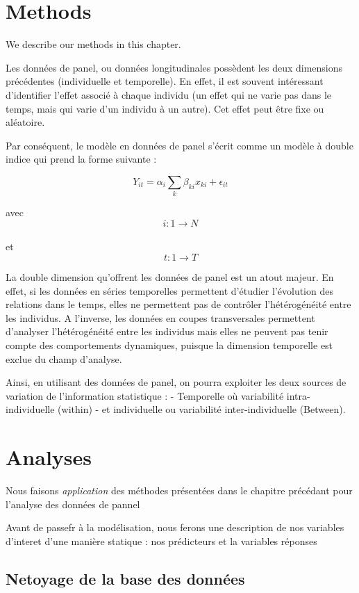 \documentclass[
]{book}
\begin{document}
\hypertarget{methods}{%
\chapter{Methods}\label{methods}}

We describe our methods in this chapter.

Les données de panel, ou données longitudinales possèdent les deux dimensions précédentes (individuelle et temporelle). En effet, il est souvent intéressant d'identifier l'effet associé à chaque individu (un effet qui ne varie pas dans le temps, mais qui varie d'un individu à un autre). Cet effet peut être fixe ou aléatoire.

Par conséquent, le modèle en données de panel s'écrit comme un modèle à double indice qui prend la forme suivante :

\[ Y_{it}= \alpha_i\sum_{k}\beta_{ki}x_{ki}+ \epsilon_{it} \]

avec
\[ i:1 \rightarrow N \]\\
et
\[ t:1 \rightarrow T \]

La double dimension qu'offrent les données de panel est un atout majeur. En effet, si les données en séries temporelles permettent d'étudier l'évolution des relations dans le temps, elles ne permettent pas de contrôler l'hétérogénéité entre les individus. A l'inverse, les données en coupes transversales permettent d'analyser l'hétérogénéité entre les individus mais elles ne peuvent pas tenir compte des comportements dynamiques, puisque la dimension temporelle est exclue du champ d'analyse.

Ainsi, en utilisant des données de panel, on pourra exploiter les deux sources de variation de l'information statistique :
- Temporelle où variabilité intra-individuelle (within)
- et individuelle ou variabilité inter-individuelle (Between).

\hypertarget{analyses}{%
\chapter{Analyses}\label{analyses}}

Nous faisons \emph{application} des méthodes présentées dans le chapitre précédant pour l'analyse des données de pannel

Avant de passefr à la modélisation, nous ferons une description de nos variables d'interet d'une manière statique : nos prédicteurs et la variables réponses

\hypertarget{netoyage-de-la-base-des-donnuxe9es}{%
\section{Netoyage de la base des données}\label{netoyage-de-la-base-des-donnuxe9es}}
\end{document}
